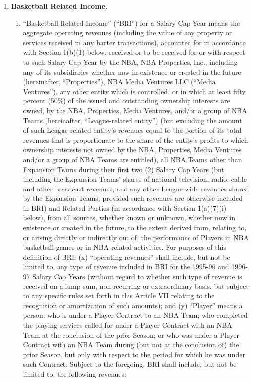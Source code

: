 \documentclass[
]{book}
\providecommand{\tightlist}{%
  \setlength{\itemsep}{0pt}\setlength{\parskip}{0pt}}
\begin{document}
\begin{enumerate}
\def\labelenumi{(\alph{enumi})}
\tightlist
\item
  \textbf{Basketball Related Income.}

  \begin{enumerate}
  \def\labelenumii{(\arabic{enumii})}
  \item
    ``Basketball Related Income'' (``BRI'') for a Salary Cap Year means the aggregate operating revenues (including the value of any property or services received in any barter transactions), accounted for in accordance with Section 1(b)(1) below, received or to be received for or with respect to such Salary Cap Year by the NBA, NBA Properties, Inc., including any of its subsidiaries whether now in existence or created in the future (hereinafter, ``Properties''), NBA Media Ventures LLC (``Media Ventures''), any other entity which is controlled, or in which at least fifty percent (50\%) of the issued and outstanding ownership interests are owned, by the NBA, Properties, Media Ventures, and/or a group of NBA Teams (hereinafter, ``League-related entity'') (but excluding the amount of such League-related entity's revenues equal to the portion of its total revenues that is proportionate to the share of the entity's profits to which ownership interests not owned by the NBA, Properties, Media Ventures and/or a group of NBA Teams are entitled), all NBA Teams other than Expansion Teams during their first two (2) Salary Cap Years (but including the Expansion Teams' shares of national television, radio, cable and other broadcast revenues, and any other League-wide revenues shared by the Expansion Teams, provided such revenues are otherwise included in BRI) and Related Parties (in accordance with Section 1(a)(7)(i) below), from all sources, whether known or unknown, whether now in existence or created in the future, to the extent derived from, relating to, or arising directly or indirectly out of, the performance of Players in NBA basketball games or in NBA-related activities. For purposes of this definition of BRI: (x) ``operating revenues'' shall include, but not be limited to, any type of revenue included in BRI for the 1995-96 and 1996-97 Salary Cap Years (without regard to whether such type of revenue is received on a lump-sum, non-recurring or extraordinary basis, but subject to any specific rules set forth in this Article VII relating to the recognition or amortization of such amounts); and (y) ``Player'' means a person: who is under a Player Contract to an NBA Team; who completed the playing services called for under a Player Contract with an NBA Team at the conclusion of the prior Season; or who was under a Player Contract with an NBA Team during (but not at the conclusion of) the prior Season, but only with respect to the period for which he was under such Contract. Subject to the foregoing, BRI shall include, but not be limited to, the following revenues:


\end{enumerate}
\end{enumerate}
\end{document}
